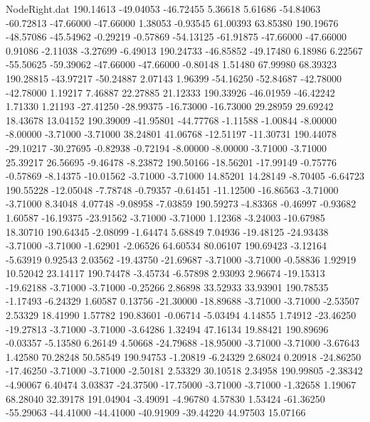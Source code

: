 \begin{filecontents}{NodeRight.dat}
 190.14613  -49.04053  -46.72455     5.36618    5.61686  -54.84063  -60.72813  -47.66000  -47.66000    1.38053   -0.93545   61.00393   63.85380
 190.19676  -48.57086  -45.54962    -0.29219   -0.57869  -54.13125  -61.91875  -47.66000  -47.66000    0.91086   -2.11038   -3.27699   -6.49013
 190.24733  -46.85852  -49.17480     6.18986    6.22567  -55.50625  -59.39062  -47.66000  -47.66000   -0.80148    1.51480   67.99980   68.39323
 190.28815  -43.97217  -50.24887     2.07143    1.96399  -54.16250  -52.84687  -42.78000  -42.78000    1.19217    7.46887   22.27885   21.12333
 190.33926  -46.01959  -46.42242     1.71330    1.21193  -27.41250  -28.99375  -16.73000  -16.73000   29.28959   29.69242   18.43678   13.04152
 190.39009  -41.95801  -44.77768    -1.11588   -1.00844   -8.00000   -8.00000   -3.71000   -3.71000   38.24801   41.06768  -12.51197  -11.30731
 190.44078  -29.10217  -30.27695    -0.82938   -0.72194   -8.00000   -8.00000   -3.71000   -3.71000   25.39217   26.56695   -9.46478   -8.23872
 190.50166  -18.56201  -17.99149    -0.75776   -0.57869   -8.14375  -10.01562   -3.71000   -3.71000   14.85201   14.28149   -8.70405   -6.64723
 190.55228  -12.05048   -7.78748    -0.79357   -0.61451  -11.12500  -16.86563   -3.71000   -3.71000    8.34048    4.07748   -9.08958   -7.03859
 190.59273   -4.83368   -0.46997    -0.93682    1.60587  -16.19375  -23.91562   -3.71000   -3.71000    1.12368   -3.24003  -10.67985   18.30710
 190.64345   -2.08099   -1.64474     5.68849    7.04936  -19.48125  -24.93438   -3.71000   -3.71000   -1.62901   -2.06526   64.60534   80.06107
 190.69423   -3.12164   -5.63919     0.92543    2.03562  -19.43750  -21.69687   -3.71000   -3.71000   -0.58836    1.92919   10.52042   23.14117
 190.74478   -3.45734   -6.57898     2.93093    2.96674  -19.15313  -19.62188   -3.71000   -3.71000   -0.25266    2.86898   33.52933   33.93901
 190.78535   -1.17493   -6.24329     1.60587    0.13756  -21.30000  -18.89688   -3.71000   -3.71000   -2.53507    2.53329   18.41990    1.57782
 190.83601   -0.06714   -5.03494     4.14855    1.74912  -23.46250  -19.27813   -3.71000   -3.71000   -3.64286    1.32494   47.16134   19.88421
 190.89696   -0.03357   -5.13580     6.26149    4.50668  -24.79688  -18.95000   -3.71000   -3.71000   -3.67643    1.42580   70.28248   50.58549
 190.94753   -1.20819   -6.24329     2.68024    0.20918  -24.86250  -17.46250   -3.71000   -3.71000   -2.50181    2.53329   30.10518    2.34958
 190.99805   -2.38342   -4.90067     6.40474    3.03837  -24.37500  -17.75000   -3.71000   -3.71000   -1.32658    1.19067   68.28040   32.39178
 191.04904   -3.49091   -4.96780     4.57830    1.53424  -61.36250  -55.29063  -44.41000  -44.41000  -40.91909  -39.44220   44.97503   15.07166

\end{filecontents}
